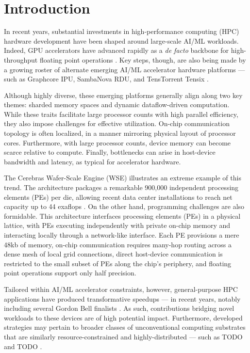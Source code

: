 \section{Introduction} \label{sec:introduction}

In recent years, substantial investments in high-performance computing (HPC) hardware development have been shaped around large-scale AI/ML workloads.
Indeed, GPU accelerators have advanced rapidly as a \textit{de facto} backbone for high-throughput floating point operations \citep{unat2024landscape}.
Key steps, though, are also being made by a growing roster of alternate emerging AI/ML accelerator hardware platforms --- such as Graphcore IPU, SambaNova RDU, and TensTorrent Tensix \citep{jia2019dissecting,lauterbach2021path,lie2022cerebras,zhang2016cambricon,emani2021accelerating,jia2019dissecting,medina2020habana}.

Although highly diverse, these emerging platforms generally align along two key themes: sharded memory spaces and dynamic dataflow-driven computation.
While these traits facilitate large processor counts with high parallel efficiency, they also impose challenges for effective utilization.
On-chip communication topology is often localized, in a manner mirroring physical layout of processor cores.
Furthermore, with large processor counts, device memory can become scarce relative to compute.
Finally, bottlenecks can arise in host-device bandwidth and latency, as typical for accelerator hardware.

The Cerebras Wafer-Scale Engine (WSE) illustrates an extreme example of this trend.
The architecture packages a remarkable 900,000 independent processing elements (PEs) per die, allowing recent data center installations to reach net capacity up to 44 exaflops \citep{lauterbach2021path,Feldman2025CerebrasOKC}.
On the other hand, programming challenges are also formidable.
This architecture interfaces processing elements (PEs) in a physical lattice, with PEs executing independently with private on-chip memory and interacting locally through a network-like interface.
Each PE provisions a mere 48kb of memory, on-chip communication requires many-hop routing across a dense mesh of local grid connections, direct host-device communication is restricted to the small subset of PEs along the chip's periphery, and floating point operations support only half precision.

Tailored within AI/ML accelerator constraints, however, general-purpose HPC applications have produced transformative speedups \citep{TODO} --- in recent years, notably including several Gordon Bell finalists \citep{TODO}.
As such, contributions bridging novel workloads to these devices are of high potential impact.
Furthermore, developed strategies may pertain to broader classes of unconventional computing substrates that are similarly resource-constrained and highly-distributed --- such as TODO and TODO \citep{TODO}.

